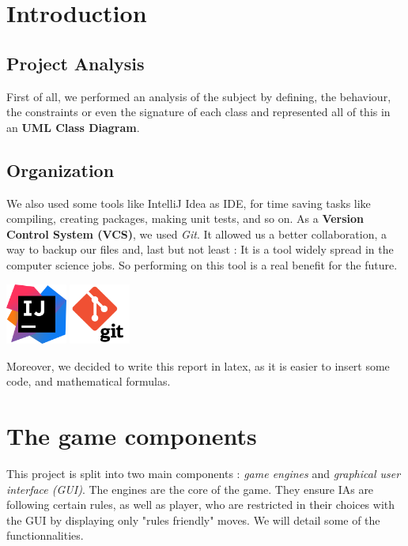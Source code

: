 \documentclass[english, 11pt, titlepage]{article}
\begin{document}
    

    \pagebreak
    \tableofcontents

    \pagebreak
    \section{Introduction}
    \subsection{Project Analysis}
    First of all, we performed an analysis of the subject by defining, the behaviour, the constraints or even the signature of each class and represented all of this in an \textbf{UML Class Diagram}.
    \subsection{Organization}
    We also used some tools like IntelliJ Idea as IDE, for time saving tasks like compiling, creating packages, making unit tests, and so on. As a \textbf{Version Control System (VCS)}, we used \emph{Git}. It allowed us a better collaboration, a way to backup our files and, last but not least : It is a tool widely spread in the computer science jobs. So performing on this tool is a real benefit for the future.

    \begin{center}
        \includegraphics[width=2cm]{IntelliJ_IDEA_Icon.svg.png}
        \hspace{2cm}
        \includegraphics[width=2cm]{git.png}
    \end{center}

    Moreover, we decided to write this report in latex, as it is easier to insert some code, and mathematical formulas.


    \section{The game components}
    This project is split into two main components : \emph{game engines} and \emph{graphical user interface (GUI)}. The engines are the core of the game. They ensure IAs are following certain rules, as well as player, who are restricted in their choices with the GUI by displaying only "rules friendly" moves. We will detail some of the functionnalities.
\end{document}
